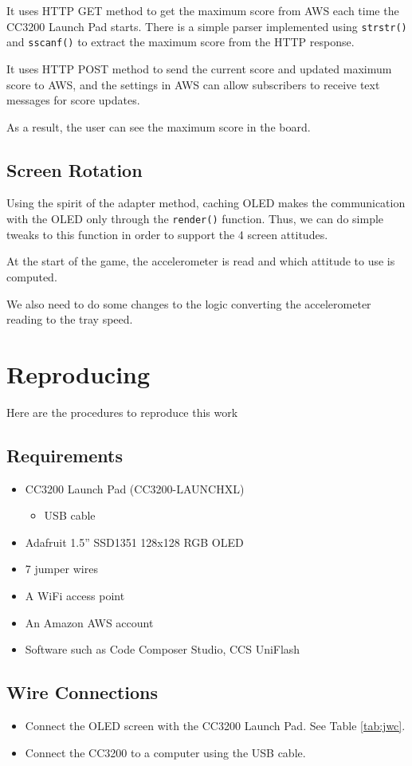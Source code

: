 \documentclass[conference]{IEEEtran}
\begin{document}
It uses HTTP GET method to get the maximum score from AWS each time the
 CC3200 Launch Pad starts. There is a simple parser implemented using
 \lstinline{strstr()} and \lstinline{sscanf()} to extract the maximum score from
 the HTTP response. 

It uses HTTP POST method to send the current score and updated maximum score to
 AWS, and the settings in AWS can allow subscribers to receive text messages
 for score updates.

As a result, the user can see the maximum score in the board.

\subsection{Screen Rotation}
Using the spirit of the adapter method, caching OLED makes the communication
 with the OLED only through the \lstinline{render()} function. Thus, we can do
 simple tweaks to this function in order to support the 4 screen attitudes.

At the start of the game, the accelerometer is read and which attitude to use
 is computed.

We also need to do some changes to the logic converting the accelerometer
 reading to the tray speed.

\section{Reproducing}
Here are the procedures to reproduce this work

\subsection{Requirements}
\begin{itemize}
\item CC3200 Launch Pad (CC3200-LAUNCHXL)
	\begin{itemize}
	\item USB cable
	\end{itemize}
\item Adafruit 1.5'' SSD1351 128x128 RGB OLED
\item 7 jumper wires
\item A WiFi access point
\item An Amazon AWS account
\item Software such as Code Composer Studio, CCS UniFlash
\end{itemize}

\subsection{Wire Connections}
\begin{itemize}
\item Connect the OLED screen with the CC3200 Launch Pad. See Table \ref{tab:jwc}.
\item Connect the CC3200 to a computer using the USB cable.
\end{itemize}
\end{document}
